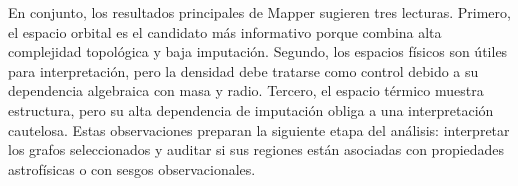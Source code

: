 En conjunto, los resultados principales de Mapper sugieren tres lecturas. Primero, el espacio orbital es el candidato más informativo porque combina alta complejidad topológica y baja imputación. Segundo, los espacios físicos son útiles para interpretación, pero la densidad debe tratarse como control debido a su dependencia algebraica con masa y radio. Tercero, el espacio térmico muestra estructura, pero su alta dependencia de imputación obliga a una interpretación cautelosa. Estas observaciones preparan la siguiente etapa del análisis: interpretar los grafos seleccionados y auditar si sus regiones están asociadas con propiedades astrofísicas o con sesgos observacionales.